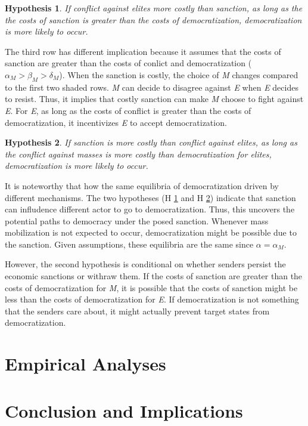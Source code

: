 \documentclass[11pt]{article}
\newtheorem{hyp}{Hypothesis}
\begin{document}
\begin{hyp} \label{h1} If conflict against elites more costly than sanction, as long as the the costs of sanction is greater than the costs of democratization, democratization is more likely to occur. \end{hyp}

The third row has different implication because it assumes that the costs of sanction are greater than the costs of conlict and democratization ($\alpha_{M} > \beta_{M} > \delta_{M}$). When the sanction is costly, the choice of \textit{M} changes compared to the first two shaded rows. \textit{M} can decide to disagree against \textit{E} when \textit{E} decides to resist. Thus, it implies that costly sanction can make \textit{M} choose to fight against \textit{E}. For \textit{E}, as long as the costs of conflict is greater than the costs of democratization, it incentivizes \textit{E} to accept democratization.

\begin{hyp}\label{h2} If sanction is more costly than conflict against elites, as long as the conflict against masses is more costly than democratization for elites, democratization is more likely to occur. \end{hyp}

It is noteworthy that how the same equilibria of democratization driven by different mechanisms. The two hypotheses (H \ref{h1} and H \ref{h2}) indicate that sanction can infludence different actor to go to democratization. Thus, this uncovers the potential paths to democracy under the posed sanction. Whenever mass mobilization is not expected to occur, democratization might be possible due to the sanction. Given assumptions, these equilibria are the same since $\alpha = \alpha_{M}$.

However, the second hypothesis is conditional on whether senders persist the economic sanctions or withraw them. If the costs of sanction are greater than the costs of democratization for \textit{M}, it is possible that the costs of sanction might be less than the costs of democratization for \textit{E}. If democratization is not something that the senders care about, it might actually prevent target states from democratization.


\section*{Empirical Analyses}

\section*{Conclusion and Implications}
\end{document}
